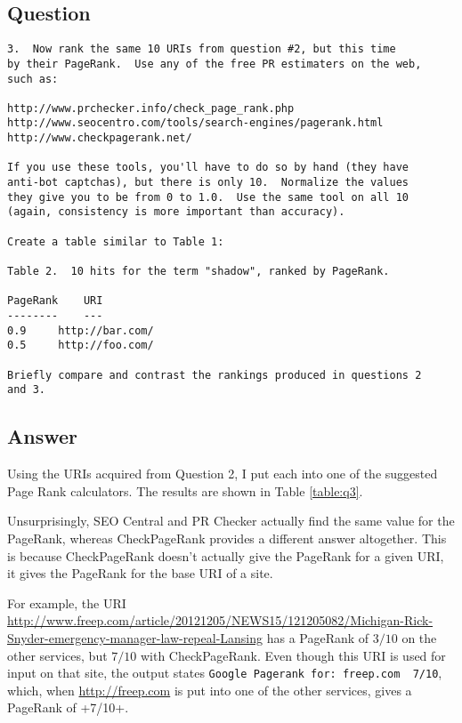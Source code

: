 \documentclass[letterpaper,11pt]{article}
\begin{document}
\subsection*{Question}

\begin{verbatim}
3.  Now rank the same 10 URIs from question #2, but this time 
by their PageRank.  Use any of the free PR estimaters on the web,
such as:

http://www.prchecker.info/check_page_rank.php
http://www.seocentro.com/tools/search-engines/pagerank.html
http://www.checkpagerank.net/

If you use these tools, you'll have to do so by hand (they have
anti-bot captchas), but there is only 10.  Normalize the values
they give you to be from 0 to 1.0.  Use the same tool on all 10
(again, consistency is more important than accuracy).

Create a table similar to Table 1:

Table 2.  10 hits for the term "shadow", ranked by PageRank.

PageRank	URI
--------	---
0.9		http://bar.com/
0.5		http://foo.com/

Briefly compare and contrast the rankings produced in questions 2
and 3.
\end{verbatim}

\newpage
\subsection*{Answer}

Using the URIs acquired from Question 2, I put each into one of the suggested Page Rank calculators.  The results are shown in Table \ref{table:q3}.

Unsurprisingly, SEO Central and PR Checker actually find the same value for the PageRank, whereas CheckPageRank provides a different answer altogether.  This is because CheckPageRank doesn't actually give the PageRank for a given URI, it gives the PageRank for the base URI of a site.

For example, the URI \url{http://www.freep.com/article/20121205/NEWS15/121205082/Michigan-Rick-Snyder-emergency-manager-law-repeal-Lansing} has a PageRank of $3/10$ on the other services, but $7/10$ with CheckPageRank.  Even though this URI is used for input on that site, the output states \verb+Google Pagerank for: freep.com  7/10+, which, when \url{http://freep.com} is put into one of the other services, gives a PageRank of +7/10+.
\end{document}
